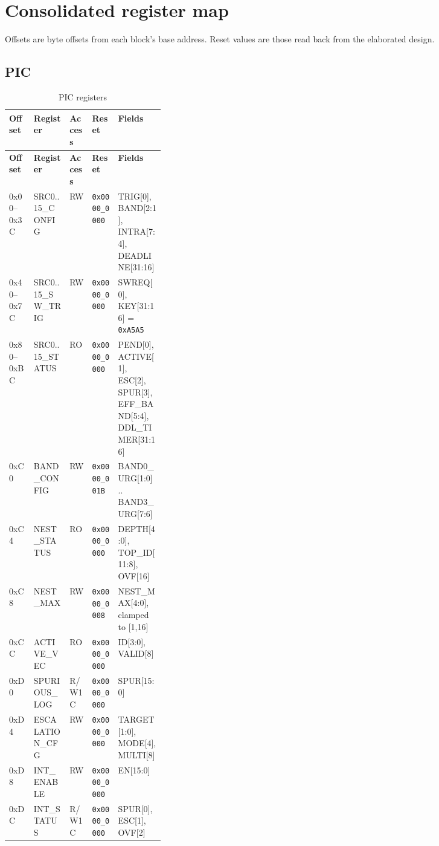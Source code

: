 \chapter{Consolidated register map}
\label{app:regmap}

Offsets are byte offsets from each block's base address. Reset values are those
read back from the elaborated design.

\section{PIC}

\begin{longtable}{@{}TlllL{0.30\linewidth}@{}}
\caption{PIC registers}\label{tab:appic}\\
\toprule
\textnormal{\textbf{Offset}} & \textbf{Register} & \textbf{Access} & \textbf{Reset} & \textbf{Fields} \\
\midrule
\endfirsthead
\toprule
\textnormal{\textbf{Offset}} & \textbf{Register} & \textbf{Access} & \textbf{Reset} & \textbf{Fields} \\
\midrule
\endhead
\bottomrule
\endfoot
0x00--0x3C & SRC0..15\_CONFIG & RW & \texttt{0x0000\_0000} & TRIG[0], BAND[2:1], INTRA[7:4], DEADLINE[31:16] \\
0x40--0x7C & SRC0..15\_SW\_TRIG & RW & \texttt{0x0000\_0000} & SWREQ[0], KEY[31:16] = \texttt{0xA5A5} \\
0x80--0xBC & SRC0..15\_STATUS & RO & \texttt{0x0000\_0000} & PEND[0], ACTIVE[1], ESC[2], SPUR[3], EFF\_BAND[5:4], DDL\_TIMER[31:16] \\
0xC0 & BAND\_CONFIG & RW & \texttt{0x0000\_001B} & BAND0\_URG[1:0] .. BAND3\_URG[7:6] \\
0xC4 & NEST\_STATUS & RO & \texttt{0x0000\_0000} & DEPTH[4:0], TOP\_ID[11:8], OVF[16] \\
0xC8 & NEST\_MAX & RW & \texttt{0x0000\_0008} & NEST\_MAX[4:0], clamped to [1,16] \\
0xCC & ACTIVE\_VEC & RO & \texttt{0x0000\_0000} & ID[3:0], VALID[8] \\
0xD0 & SPURIOUS\_LOG & R/W1C & \texttt{0x0000\_0000} & SPUR[15:0] \\
0xD4 & ESCALATION\_CFG & RW & \texttt{0x0000\_0000} & TARGET[1:0], MODE[4], MULTI[8] \\
0xD8 & INT\_ENABLE & RW & \texttt{0x0000\_0000} & EN[15:0] \\
0xDC & INT\_STATUS & R/W1C & \texttt{0x0000\_0000} & SPUR[0], ESC[1], OVF[2] \\
\end{longtable}

